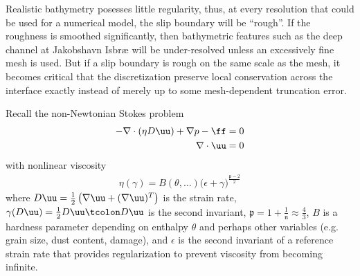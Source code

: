 Realistic bathymetry posesses little regularity, thus, at every resolution that could be used for a numerical model, the slip boundary will be ``rough''.  If the roughness is smoothed significantly, then bathymetric features such as the deep channel at Jakobshavn Isbræ will be under-resolved unless an excessively fine mesh is used.  But if a slip boundary is rough on the same scale as the mesh, it becomes critical that the discretization preserve local conservation across the interface exactly instead of merely up to some mesh-dependent truncation error.

Recall the non-Newtonian Stokes problem
\begin{align}\label{eq:slip:stokes-strong}
    -\nabla \cdot(\eta D\uu) + \nabla p - \ff &= 0 \\
    \nabla \cdot \uu &= 0
\end{align}
with nonlinear viscosity
\begin{gather}
  \eta(\gamma) = B(\theta,\dotsc)\big(\epsilon + \gamma \big)^{\frac{\mathfrak{p}-2}{2}}
\end{gather}
where $D\uu = \tfrac 1 2 \left(\nabla \uu + (\nabla \uu)^T \right)$ is the strain rate, $\gamma(D\uu) = \tfrac 1 2 D\uu \tcolon D\uu$ is the second invariant, $\mathfrak{p} = 1 + \tfrac{1}{\mathfrak{n}} \approx \tfrac 4 3$, $B$ is a hardness parameter depending on enthalpy $\theta$ and perhaps other variables (e.g. grain size, dust content, damage), and $\epsilon$ is the second invariant of a reference strain rate that provides regularization to prevent viscosity from becoming infinite.

